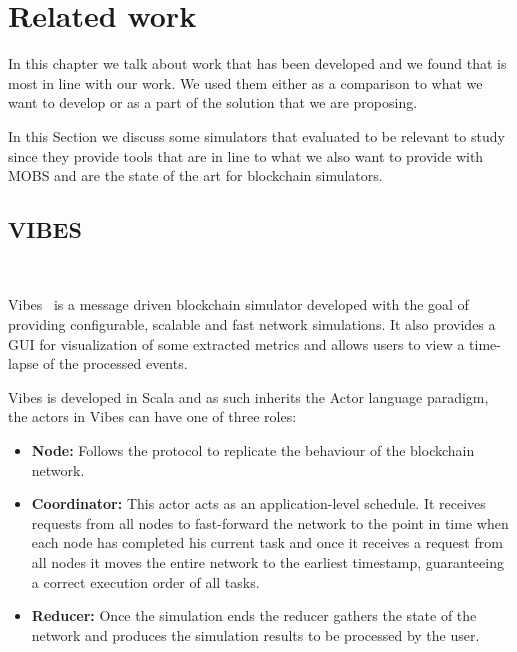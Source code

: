 
%

\chapter{Related work}\label{cha:related_work}

In this chapter we talk about work that has been developed and we found that is most in line with our work. We used them
either as a comparison to what we want to develop or as a part of the solution that
we are proposing.

In this Section we discuss some simulators that evaluated to be relevant to study
since they provide tools that are in line to what we also want to provide with MOBS and
are the state of the art for blockchain simulators.

\section{VIBES}~\label{subsec:vibes}

Vibes~\cite{vibes} is a message driven blockchain simulator developed with the goal of providing
configurable, scalable and fast network simulations. It also provides a GUI for visualization
of some extracted metrics and allows users to view a time-lapse of the processed events.

Vibes is developed in Scala and as such inherits the Actor language paradigm, the actors in
Vibes can have one of three roles:

\begin{itemize}
  \item \textbf{Node:} Follows the protocol to replicate the behaviour of the blockchain
  network.
  \item \textbf{Coordinator:} This actor acts as an application-level schedule. It receives
  requests from all nodes to fast-forward the network to the point in time when each node
  has completed his current task and once it receives a request from all nodes it moves the
  entire network to the earliest timestamp, guaranteeing a correct execution order of all tasks.
  \item \textbf{Reducer:} Once the simulation ends the reducer gathers the state of the network
  and produces the simulation results to be processed by the user.
\end{itemize}

